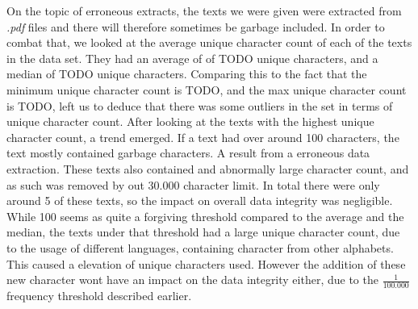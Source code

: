 On the topic of erroneous extracts, the texts we were given were extracted from
\textit{.pdf} files and there will therefore sometimes be garbage included. In
order to combat that, we looked at the average unique character count of each of
the texts in the data set. They had an average of of TODO unique characters, and
a median of TODO unique characters. Comparing this to the fact that the minimum
unique character count is TODO, and the max unique character count is TODO,
left us to deduce that there was some outliers in the set in terms of unique
character count. After looking at the texts with the highest unique character
count, a trend emerged. If a text had over around 100 characters, the text
mostly contained garbage characters. A result from a erroneous data extraction.
These texts also contained and abnormally large character count, and as such
was removed by out 30.000 character limit. In total there were only around 5 of
these texts, so the impact on overall data integrity was negligible. While 100
seems as quite a forgiving threshold compared to the average and the median, the
texts under that threshold had a large unique character count, due to the usage
of different languages, containing character from other alphabets. This caused a
elevation of unique characters used. However the addition of these new character
wont have an impact on the data integrity either, due to the $\frac{1}{100.000}$
frequency threshold described earlier.
